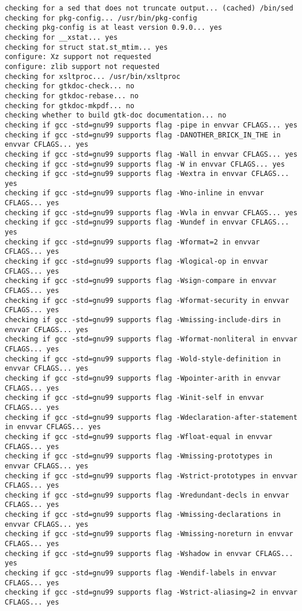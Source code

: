 \documentclass[11pt,a4paper]{article}
\begin{document}
{\begin{shaded}
\begin{verbatim}
checking for a sed that does not truncate output... (cached) /bin/sed
checking for pkg-config... /usr/bin/pkg-config
checking pkg-config is at least version 0.9.0... yes
checking for __xstat... yes
checking for struct stat.st_mtim... yes
configure: Xz support not requested
configure: zlib support not requested
checking for xsltproc... /usr/bin/xsltproc
checking for gtkdoc-check... no
checking for gtkdoc-rebase... no
checking for gtkdoc-mkpdf... no
checking whether to build gtk-doc documentation... no
checking if gcc -std=gnu99 supports flag -pipe in envvar CFLAGS... yes
checking if gcc -std=gnu99 supports flag -DANOTHER_BRICK_IN_THE in envvar CFLAGS... yes
checking if gcc -std=gnu99 supports flag -Wall in envvar CFLAGS... yes
checking if gcc -std=gnu99 supports flag -W in envvar CFLAGS... yes
checking if gcc -std=gnu99 supports flag -Wextra in envvar CFLAGS... yes
checking if gcc -std=gnu99 supports flag -Wno-inline in envvar CFLAGS... yes
checking if gcc -std=gnu99 supports flag -Wvla in envvar CFLAGS... yes
checking if gcc -std=gnu99 supports flag -Wundef in envvar CFLAGS... yes
checking if gcc -std=gnu99 supports flag -Wformat=2 in envvar CFLAGS... yes
checking if gcc -std=gnu99 supports flag -Wlogical-op in envvar CFLAGS... yes
checking if gcc -std=gnu99 supports flag -Wsign-compare in envvar CFLAGS... yes
checking if gcc -std=gnu99 supports flag -Wformat-security in envvar CFLAGS... yes
checking if gcc -std=gnu99 supports flag -Wmissing-include-dirs in envvar CFLAGS... yes
checking if gcc -std=gnu99 supports flag -Wformat-nonliteral in envvar CFLAGS... yes
checking if gcc -std=gnu99 supports flag -Wold-style-definition in envvar CFLAGS... yes
checking if gcc -std=gnu99 supports flag -Wpointer-arith in envvar CFLAGS... yes
checking if gcc -std=gnu99 supports flag -Winit-self in envvar CFLAGS... yes
checking if gcc -std=gnu99 supports flag -Wdeclaration-after-statement in envvar CFLAGS... yes
checking if gcc -std=gnu99 supports flag -Wfloat-equal in envvar CFLAGS... yes
checking if gcc -std=gnu99 supports flag -Wmissing-prototypes in envvar CFLAGS... yes
checking if gcc -std=gnu99 supports flag -Wstrict-prototypes in envvar CFLAGS... yes
checking if gcc -std=gnu99 supports flag -Wredundant-decls in envvar CFLAGS... yes
checking if gcc -std=gnu99 supports flag -Wmissing-declarations in envvar CFLAGS... yes
checking if gcc -std=gnu99 supports flag -Wmissing-noreturn in envvar CFLAGS... yes
checking if gcc -std=gnu99 supports flag -Wshadow in envvar CFLAGS... yes
checking if gcc -std=gnu99 supports flag -Wendif-labels in envvar CFLAGS... yes
checking if gcc -std=gnu99 supports flag -Wstrict-aliasing=2 in envvar CFLAGS... yes

\end{verbatim}
\end{shaded}}
\end{document}
